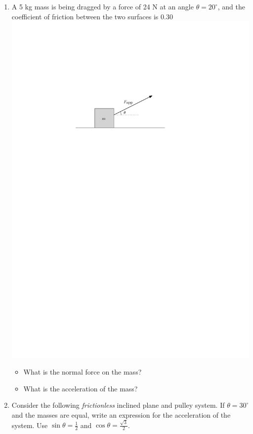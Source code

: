 \documentclass[12pt]{report}
\begin{document}
\begin{enumerate}
\item A 5 kg mass is being dragged by a force of 24 N at an angle $\theta = 20^\circ$, and the coefficient of friction between the two surfaces is 0.30 \\
\mbox{} \hfill \includegraphics{boxAngle} \hfill \mbox{}
\begin{itemize}
\item What is the normal force on the mass?
\vspace{4cm}
\item What is the acceleration of the mass?
\vspace{5cm}
\end{itemize}

\item Consider the following \emph{frictionless} inclined plane and pulley system.  If $\theta = 30^\circ$ and the masses are equal, write an expression for the acceleration of the system.  Use $\sin \theta = \frac{1}{2}$ and $\cos \theta = \frac{\sqrt{3}}{2}$.


\end{enumerate}
\end{document}
